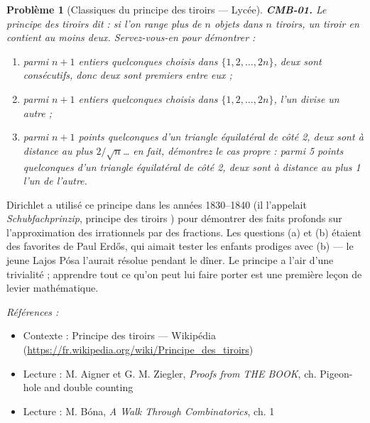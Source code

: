 \documentclass[11pt]{article}
\newtheorem{problem}{Problème}
\newenvironment{refs}{\par\small\noindent\emph{Références :}\begin{itemize}\setlength\itemsep{0pt}}{\end{itemize}\normalsize}
\begin{document}
\begin{problem}[{Classiques du principe des tiroirs --- Lycée}]
\textbf{CMB-01.} Le principe des tiroirs dit : si l'on range plus de $ n $ objets dans
$ n $ tiroirs, un tiroir en contient au moins deux. Servez-vous-en pour démontrer :
\begin{enumerate}
\item[(a)] parmi $ n+1 $ entiers quelconques choisis dans $ \{1, 2, \dots, 2n\} $, deux sont
consécutifs, donc deux sont premiers entre eux ;
\item[(b)] parmi $ n+1 $ entiers quelconques choisis dans $ \{1, 2, \dots, 2n\} $, l'un divise un
autre ;
\item[(c)] parmi $ n+1 $ points quelconques d'un triangle équilatéral de côté 2, deux sont à distance
au plus $ 2/\sqrt{n} $\dots{} en fait, démontrez le cas propre : parmi 5 points quelconques d'un
triangle équilatéral de côté 2, deux sont à distance au plus 1 l'un de l'autre.
\end{enumerate}

\end{problem}

\noindent Dirichlet a utilisé ce principe dans les années 1830--1840 (il l'appelait
\textit{Schubfachprinzip}, \og{} principe des tiroirs \fg{}) pour démontrer des faits profonds sur
l'approximation des irrationnels par des fractions. Les questions (a) et (b) étaient des
favorites de Paul Erd\H{o}s, qui aimait tester les enfants prodiges avec (b) --- le jeune Lajos Pósa
l'aurait résolue pendant le dîner. Le principe a l'air d'une trivialité ; apprendre tout ce qu'on
peut lui faire porter est une première leçon de levier mathématique.

\begin{refs}
\item Contexte : Principe des tiroirs --- Wikipédia (\url{https://fr.wikipedia.org/wiki/Principe_des_tiroirs})
\item Lecture : M. Aigner et G. M. Ziegler, \textit{Proofs from THE BOOK}, ch. \og{} Pigeon-hole and double counting \fg{}
\item Lecture : M. Bóna, \textit{A Walk Through Combinatorics}, ch. 1
\end{refs}

\bigskip
\end{document}

